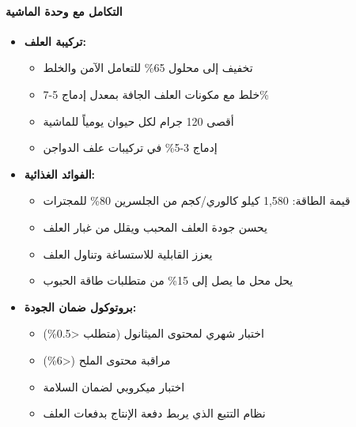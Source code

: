 \paragraph{التكامل مع وحدة الماشية}
\label{sec:glycerin_feed_supplement}
\begin{itemize}
    \item \textbf{تركيبة العلف:}
    \begin{itemize}
        \item تخفيف إلى محلول 65\% للتعامل الآمن والخلط
        \item خلط مع مكونات العلف الجافة بمعدل إدماج 5-7\%
        \item أقصى 120 جرام لكل حيوان يومياً للماشية
        \item إدماج 3-5\% في تركيبات علف الدواجن
    \end{itemize}
    
    \item \textbf{الفوائد الغذائية:}
    \begin{itemize}
        \item قيمة الطاقة: 1,580 كيلو كالوري/كجم من الجلسرين 80\% للمجترات
        \item يحسن جودة العلف المحبب ويقلل من غبار العلف
        \item يعزز القابلية للاستساغة وتناول العلف
        \item يحل محل ما يصل إلى 15\% من متطلبات طاقة الحبوب
    \end{itemize}
    
    \item \textbf{بروتوكول ضمان الجودة:}
    \begin{itemize}
        \item اختبار شهري لمحتوى الميثانول (متطلب <0.5\%)
        \item مراقبة محتوى الملح (<6\%)
        \item اختبار ميكروبي لضمان السلامة
        \item نظام التتبع الذي يربط دفعة الإنتاج بدفعات العلف
    \end{itemize}
\end{itemize}

